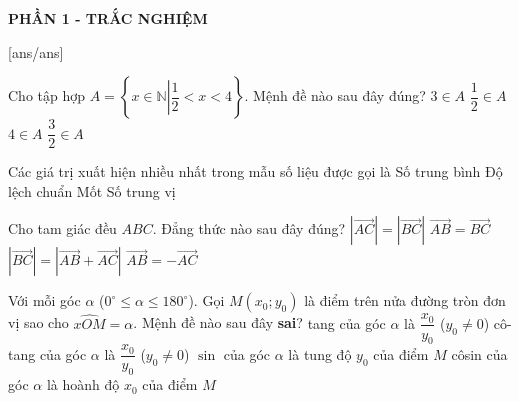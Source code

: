 
\begin{center}
	\textbf{PHẦN 1 - TRẮC NGHIỆM}
\end{center}
[ans/ans]
\begin{ex}%
Cho tập hợp $A=\left\lbrace x \in \mathbb{N} \left| \dfrac{1}{2}<x<4 \right.\right\rbrace$. Mệnh đề nào sau đây đúng?
	\choice
	{\True $3 \in A$}
	{$\dfrac{1}{2} \in A$}
	{$4 \in A$}
	{$\dfrac{3}{2} \in A$}
\end{ex}

\begin{ex}%
	Các giá trị xuất hiện nhiều nhất trong mẫu số liệu được gọi là
	\choice
	{Số trung bình}
	{Độ lệch chuẩn}
	{\True Mốt}
	{Số trung vị}
\end{ex}

\begin{ex}%
	Cho tam giác đều $ABC$. Đẳng thức nào sau đây đúng?
	\choice
	{\True $\left| \overrightarrow{AC}\right|=\left| \overrightarrow{BC}\right|$}
	{$\overrightarrow{AB}=\overrightarrow{BC}$}
	{$\left| \overrightarrow{BC}\right|=\left| \overrightarrow{AB}+\overrightarrow{AC}\right|$}
	{$\overrightarrow{AB}=-\overrightarrow{AC}$}
\end{ex}

\begin{ex}%
	Với mỗi góc $\alpha$ ($0^{\circ} \le \alpha \le 180^{\circ}$). Gọi $M\left(x_0;y_0\right)$ là điểm trên nửa đường tròn đơn vị sao cho $\widehat{xOM}=\alpha$. Mệnh đề nào sau đây \textbf{sai}?
	\choice
	{\True tang của góc $\alpha$ là $\dfrac{x_0}{y_0}$ ($y_0 \ne 0$)}
	{cô-tang của góc $\alpha$ là $\dfrac{x_0}{y_0}$ ($y_0 \ne 0$)}
	{$\sin$ của góc $\alpha$ là tung độ $y_0$ của điểm $M$}
	{côsin của góc $\alpha$ là hoành độ $x_0$ của điểm $M$}
\end{ex}

